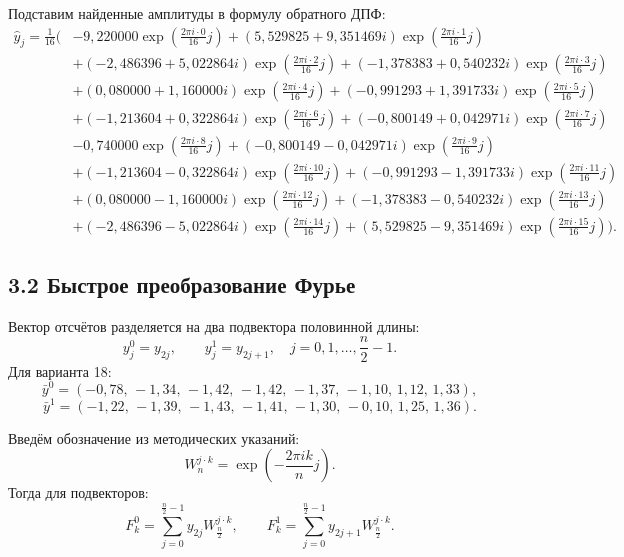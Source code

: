 \documentclass[14pt,a4paper]{extarticle}
\begin{document}
Подставим найденные амплитуды в формулу обратного ДПФ:
\begingroup\scriptsize
\begin{align*}
\hat y_j=\frac{1}{16}\bigl(&-9{,}220000\exp\left(\frac{2\pi i\cdot0}{16}j\right)
+(5{,}529825+9{,}351469i)\exp\left(\frac{2\pi i\cdot1}{16}j\right)\\
&+(-2{,}486396+5{,}022864i)\exp\left(\frac{2\pi i\cdot2}{16}j\right)
+(-1{,}378383+0{,}540232i)\exp\left(\frac{2\pi i\cdot3}{16}j\right)\\
&+(0{,}080000+1{,}160000i)\exp\left(\frac{2\pi i\cdot4}{16}j\right)
+(-0{,}991293+1{,}391733i)\exp\left(\frac{2\pi i\cdot5}{16}j\right)\\
&+(-1{,}213604+0{,}322864i)\exp\left(\frac{2\pi i\cdot6}{16}j\right)
+(-0{,}800149+0{,}042971i)\exp\left(\frac{2\pi i\cdot7}{16}j\right)\\
&-0{,}740000\exp\left(\frac{2\pi i\cdot8}{16}j\right)
+(-0{,}800149-0{,}042971i)\exp\left(\frac{2\pi i\cdot9}{16}j\right)\\
&+(-1{,}213604-0{,}322864i)\exp\left(\frac{2\pi i\cdot10}{16}j\right)
+(-0{,}991293-1{,}391733i)\exp\left(\frac{2\pi i\cdot11}{16}j\right)\\
&+(0{,}080000-1{,}160000i)\exp\left(\frac{2\pi i\cdot12}{16}j\right)
+(-1{,}378383-0{,}540232i)\exp\left(\frac{2\pi i\cdot13}{16}j\right)\\
&+(-2{,}486396-5{,}022864i)\exp\left(\frac{2\pi i\cdot14}{16}j\right)
+(5{,}529825-9{,}351469i)\exp\left(\frac{2\pi i\cdot15}{16}j\right)\bigr).
\end{align*}
\endgroup

\subsection*{3.2 Быстрое преобразование Фурье}
Вектор отсчётов разделяется на два подвектора половинной длины:
\[
y^0_j=y_{2j},\qquad y^1_j=y_{2j+1},\quad j=0,1,\ldots,\frac{n}{2}-1.
\]
Для варианта 18:
\[
\bar y^0=(-0{,}78,\,-1{,}34,\,-1{,}42,\,-1{,}42,\,-1{,}37,\,-1{,}10,\,1{,}12,\,1{,}33),
\]
\[
\bar y^1=(-1{,}22,\,-1{,}39,\,-1{,}43,\,-1{,}41,\,-1{,}30,\,-0{,}10,\,1{,}25,\,1{,}36).
\]

Введём обозначение из методических указаний:
\[
W_n^{j\cdot k}=\exp\left(-\frac{2\pi i k}{n}j\right).
\]
Тогда для подвекторов:
\[
F^0_k=\sum_{j=0}^{\frac{n}{2}-1}y_{2j}W_{\frac{n}{2}}^{j\cdot k},
\qquad
F^1_k=\sum_{j=0}^{\frac{n}{2}-1}y_{2j+1}W_{\frac{n}{2}}^{j\cdot k}.
\]
\end{document}
